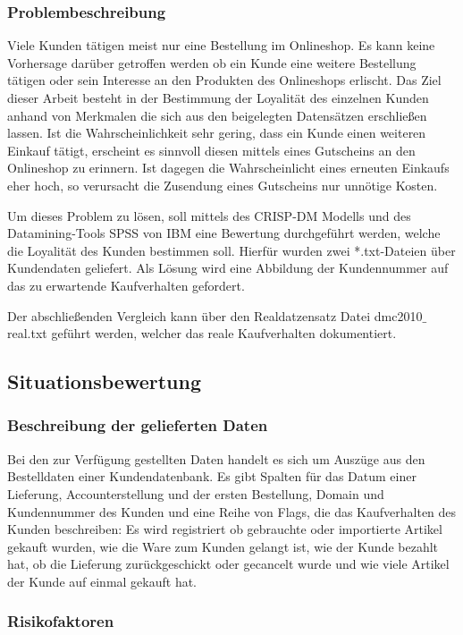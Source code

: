 \documentclass[a4paper,12pt]{article}
\begin{document}
\subsubsection{Problembeschreibung}
Viele Kunden tätigen meist nur eine Bestellung im Onlineshop. Es kann keine Vorhersage darüber getroffen werden ob ein Kunde eine weitere Bestellung tätigen oder sein Interesse an den Produkten des Onlineshops erlischt. Das Ziel dieser Arbeit besteht in der Bestimmung der Loyalität des einzelnen Kunden anhand von Merkmalen die sich aus den beigelegten Datensätzen erschließen lassen. Ist die Wahrscheinlichkeit sehr gering, dass ein Kunde einen weiteren Einkauf tätigt, erscheint es sinnvoll diesen mittels eines Gutscheins an den Onlineshop zu erinnern. Ist dagegen die Wahrscheinlicht eines erneuten Einkaufs eher hoch, so verursacht die Zusendung eines Gutscheins nur unnötige Kosten.  
\par
Um dieses Problem zu lösen, soll mittels des CRISP-DM Modells \cite{crisp}
und des Datamining-Tools SPSS von IBM eine Bewertung durchgeführt werden, welche die
Loyalität des Kunden bestimmen soll. Hierfür wurden zwei *.txt-Dateien über Kundendaten geliefert.
Als Lösung wird eine Abbildung der Kundennummer auf das zu erwartende Kaufverhalten gefordert. 

Der abschließenden Vergleich kann über den Realdatzensatz Datei dmc2010$\_$real.txt geführt werden, welcher das reale Kaufverhalten dokumentiert.
\subsection{Situationsbewertung}

\subsubsection{Beschreibung der gelieferten Daten}
Bei den zur Verfügung gestellten Daten  handelt es sich um Auszüge aus den Bestelldaten einer Kundendatenbank.
Es gibt Spalten für das Datum einer Lieferung, Accounterstellung und der
ersten Bestellung, Domain und Kundennummer des Kunden und eine Reihe von Flags, die das Kaufverhalten des Kunden beschreiben:
Es wird registriert ob gebrauchte oder importierte Artikel gekauft wurden, wie die Ware zum Kunden gelangt ist, wie der Kunde bezahlt hat, ob die Lieferung zurückgeschickt oder gecancelt wurde und wie viele Artikel der Kunde auf einmal gekauft hat.

\subsubsection{Risikofaktoren}
\end{document}
